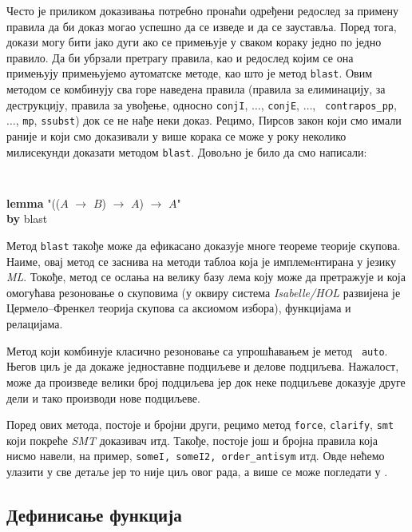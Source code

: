 Често је приликом доказивања потребно пронаћи одређени редослед за
примену правила да би доказ могао успешно да се изведе и да се
зауставља. Поред тога, докази могу бити јако дуги ако се примењује у
сваком кораку једно по једно правило. Да би убрзали претрагу правила,
као и редослед којим се она примењују примењујемо аутоматске методе,
као што је метод {\tt blast}. Овим методом се комбинују сва горе
наведена правила (правила за елиминацију, за деструкцију, правила за
увођење, односно {\tt conjI}, $\ldots$, {\tt conjE}, $\ldots$, {\tt
  contrapos\_pp}, $\ldots$, {\tt mp}, {\tt ssubst}) док се не нађе
неки доказ. Рецимо, Пирсов закон који смо имали раније и који смо
доказивали у више корака се може у року неколико милисекунди доказати
методом {\tt blast}. Довољно је било да смо написали:
\begin{small}
{\tt 
\begin{tabbing}
\textbf{lemma} "(($A$ $\longrightarrow$ $B$) $\longrightarrow$ $A$) $\longrightarrow$ $A$" \\
\textbf{by} blast
\end{tabbing}
}
\end{small}

Метод {\tt blast} такође може да ефикасано доказује многе теореме 
теорије скупова. Наиме, овај
метод се заснива на методи таблоа која је имплемeнтирана у језику
\emph{ML}. Токође, метод се ослања на велику базу лема коју може да
претражује и која омогућава резоновање о скуповима (у оквиру система
\emph{Isabelle/HOL} развијена је Цермело--Френкел теорија скупова са
аксиомом избора), функцијама и релацијама.

Метод који комбинује класично резоновање са упрошћавањем је метод {\tt
  auto}. Његов циљ је да докаже једноставне подциљеве и делове
подциљева. Нажалост, може да произведе велики број подциљева јер док
неке подциљеве доказује друге дели и тако производи нове подциљеве.

Поред ових метода, постоје и бројни други, рецимо метод {\tt force},
{\tt clarify}, {\tt smt} који покреће \emph{SMT} доказивач
\cite{isabelleautomatic} итд. Такође, постоје још и бројна правила
која нисмо навели, на пример, {\tt someI, someI2, order\_antisym}
итд. Овде нећемо улазити у све детаље јер то није циљ овог рада, а
више се може погледати у \cite{Isabelle}.

\subsection{Дефинисање функција}

